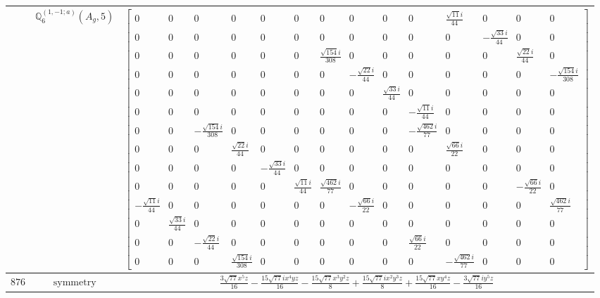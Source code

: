 \documentclass[fleqn,8pt,landscape]{jsarticle}
\begin{document}
\begin{longtable}{ccc}
$  $ & $ \mathbb{Q}_{6}^{(1,-1;a)}(A_{g},5) $ & $ \begin{bmatrix} 0 & 0 & 0 & 0 & 0 & 0 & 0 & 0 & 0 & 0 & \frac{\sqrt{11} i}{44} & 0 & 0 & 0 \\ 0 & 0 & 0 & 0 & 0 & 0 & 0 & 0 & 0 & 0 & 0 & - \frac{\sqrt{33} i}{44} & 0 & 0 \\ 0 & 0 & 0 & 0 & 0 & 0 & \frac{\sqrt{154} i}{308} & 0 & 0 & 0 & 0 & 0 & \frac{\sqrt{22} i}{44} & 0 \\ 0 & 0 & 0 & 0 & 0 & 0 & 0 & - \frac{\sqrt{22} i}{44} & 0 & 0 & 0 & 0 & 0 & - \frac{\sqrt{154} i}{308} \\ 0 & 0 & 0 & 0 & 0 & 0 & 0 & 0 & \frac{\sqrt{33} i}{44} & 0 & 0 & 0 & 0 & 0 \\ 0 & 0 & 0 & 0 & 0 & 0 & 0 & 0 & 0 & - \frac{\sqrt{11} i}{44} & 0 & 0 & 0 & 0 \\ 0 & 0 & - \frac{\sqrt{154} i}{308} & 0 & 0 & 0 & 0 & 0 & 0 & - \frac{\sqrt{462} i}{77} & 0 & 0 & 0 & 0 \\ 0 & 0 & 0 & \frac{\sqrt{22} i}{44} & 0 & 0 & 0 & 0 & 0 & 0 & \frac{\sqrt{66} i}{22} & 0 & 0 & 0 \\ 0 & 0 & 0 & 0 & - \frac{\sqrt{33} i}{44} & 0 & 0 & 0 & 0 & 0 & 0 & 0 & 0 & 0 \\ 0 & 0 & 0 & 0 & 0 & \frac{\sqrt{11} i}{44} & \frac{\sqrt{462} i}{77} & 0 & 0 & 0 & 0 & 0 & - \frac{\sqrt{66} i}{22} & 0 \\ - \frac{\sqrt{11} i}{44} & 0 & 0 & 0 & 0 & 0 & 0 & - \frac{\sqrt{66} i}{22} & 0 & 0 & 0 & 0 & 0 & \frac{\sqrt{462} i}{77} \\ 0 & \frac{\sqrt{33} i}{44} & 0 & 0 & 0 & 0 & 0 & 0 & 0 & 0 & 0 & 0 & 0 & 0 \\ 0 & 0 & - \frac{\sqrt{22} i}{44} & 0 & 0 & 0 & 0 & 0 & 0 & \frac{\sqrt{66} i}{22} & 0 & 0 & 0 & 0 \\ 0 & 0 & 0 & \frac{\sqrt{154} i}{308} & 0 & 0 & 0 & 0 & 0 & 0 & - \frac{\sqrt{462} i}{77} & 0 & 0 & 0 \end{bmatrix} $ \\ \hline
$ 876 $ & $ \text{symmetry} $ & $ \frac{3 \sqrt{77} x^{5} z}{16} - \frac{15 \sqrt{77} i x^{4} y z}{16} - \frac{15 \sqrt{77} x^{3} y^{2} z}{8} + \frac{15 \sqrt{77} i x^{2} y^{3} z}{8} + \frac{15 \sqrt{77} x y^{4} z}{16} - \frac{3 \sqrt{77} i y^{5} z}{16} $ \\

\end{longtable}
\end{document}
